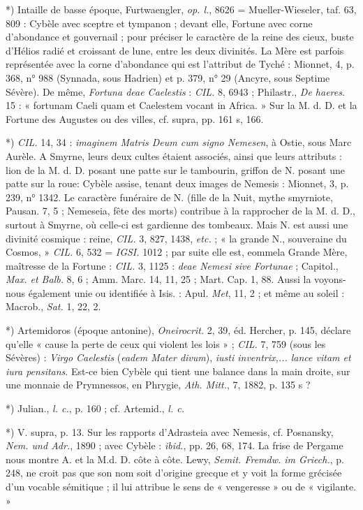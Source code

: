 \documentclass[a4paper, 11pt, oneside, polutonikogreek, french]{article}
\begin{document}
*) Intaille de basse époque, Furtwaengler, \emph{op. l.}, 8626 = Mueller-Wieseler, taf. 63, 809 : Cybèle avec sceptre et tympanon ; devant elle, Fortune avec corne d'abondance et gouvernail ; pour préciser le caractère de la reine des cieux, buste d'Hélios radié et croissant de lune, entre les deux divinités. La Mère est parfois représentée avec la corne d'abondance qui est l'attribut de Tyché : Mionnet, 4, p. 368, n° 988 (Synnada, sous Hadrien) et p. 379, n° 29 (Ancyre, sous Septime Sévère). De même, \emph{Fortuna deae Caelestis} : \emph{CIL.} 8, 6943 ; Philastr., \emph{De haeres}. 15 : « fortunam Caeli quam et Caelestem vocant in Africa. » Sur la M. d. D. et la Fortune des Augustes ou des villes, cf. supra, pp. 161 s, 166.

*) \emph{CIL.} 14, 34 : \emph{imaginem Matris Deum cum signo Nemesen}, à Ostie, sous Marc Aurèle. A Smyrne, leurs deux cultes étaient associés, ainsi que leurs attributs : lion de la M. d. D. posant une patte sur le tambourin, griffon de N. posant une patte sur la roue: Cybèle assise, tenant deux images de Nemesis : Mionnet, 3, p. 239, n° 1342. Le caractère funéraire de N. (fille de la Nuit, mythe smyrniote, Pausan. 7, 5 ; Nemeseia, fête des morts) contribue à la rapprocher de la M. d. D., surtout à Smyrne, où celle-ci est gardienne des tombeaux. Mais N. est aussi une divinité cosmique : reine, \emph{CIL.} 3, 827, 1438, \emph{etc.} ; « la grande N., souveraine du Cosmos, » \emph{CIL.} 6, 532 = \emph{IGSI.} 1012 ; par suite elle est, eommela Grande Mère, maîtresse de la Fortune : \emph{CIL.} 3, 1125 : \emph{deae Nemesi sive Fortunae} ; Capitol., \emph{Max. et Balb.} 8, 6 ; Amm. Marc. 14, 11, 25 ; Mart. Cap. 1, 88. Aussi la voyons-nous également unie ou identifiée à Isis. : Apul. \emph{Met}, 11, 2 ; et même au soleil : Macrob., \emph{Sat.} 1, 22, 2.

*) Artemidoros (époque antonine), \emph{Oneirocrit.} 2, 39, éd. Hercher, p. 145, déclare qu'elle « cause la perte de ceux qui violent les lois » ; \emph{CIL.} 7, 759 (sous les Sévères) : \emph{Virgo Caelestis} (\emph{eadem Mater divum}), \emph{iusti inventrix,... lance vitam et iura pensitans}. Est-ce bien Cybèle qui tient une balance dans la main droite, sur une monnaie de Prymnessos, en Phrygie, \emph{Ath. Mitt.}, 7, 1882, p. 135 s ?

*) Julian., \emph{l. c.}, p. 160 ; cf. Artemid., \emph{l. c.}

*) V. supra, p. 13. Sur les rapports d'Adrasteia avec Nemesis, cf. Posnansky, \emph{Nem. und Adr.}, 1890 ; avec Cybèle : \emph{ibid.}, pp. 26, 68, 174. La frise de Pergame nous montre A. et la M.d. D. côte à côte. Lewy, \emph{Semit. Fremdw. im Griech.}, p. 248, ne croit pas que son nom soit d'origine grecque et y voit la forme grécisée d'un vocable sémitique ; il lui attribue le sens de « vengeresse » ou de « vigilante. »
\end{document}
